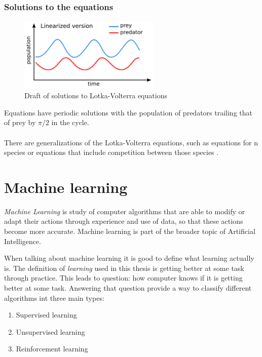 \subsubsection{Solutions to the equations}
\begin{figure}[H]
    \centering
    \includegraphics[width=0.6\textwidth]{Images/Lotka_Volterra_dynamics.jpg}
    \caption{Draft of solutions to Lotka-Volterra equations \cite{Lotka_Volterra_dynamics}}
    \label{fig:Lotka_Volterra_dynamics}
\end{figure}

Equations have periodic solutions with the population of predators trailing that of prey by $\pi/2$ in the cycle.
\\
\\
There are generalizations of the Lotka-Volterra equations, such as equations for n species or equations that include competition between those species \cite{BHARGAVA1989319}.

\section{Machine learning}
\emph{Machine Learning} is study of computer algorithms that are able to modify or adapt their actions through experience and use of data, so that these actions become more accurate. Machine learning is part of the broader topic of Artificial Intelligence.

When talking about machine learning it is good to define what learning actually is. The definition of \emph{learning} used in this thesis is getting better at some task through practice. This leads to question: how computer knows if it is getting better at some task. Answering that question provide a way to classify different algorithms int three main types:
\begin{enumerate}
    \item Supervised learning
    \item Unsupervised learning
    \item Reinforcement learning \cite{marsland_2015}
\end{enumerate}

